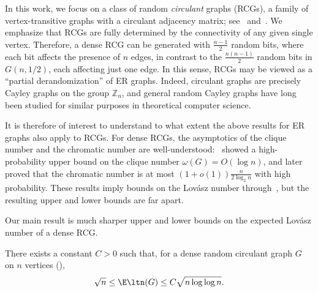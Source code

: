 In this work, we focus on a class of random \emph{circulant} graphs (RCGs), a family of vertex-transitive graphs with a circulant adjacency matrix; see~ and~. 
We emphasize that RCGs are fully determined by the connectivity of any given single vertex. Therefore, a dense RCG can be generated with \(\frac{n - 1}{2}\) random bits, where each bit affects the presence of \(n\) edges, in contrast to the \(\frac{n(n - 1)}{2}\) random bits in $G(n,1/2)$, each affecting just one edge.
In this sense, RCGs may be viewed as a ``partial derandomization'' of ER graphs.
Indeed, circulant graphs are precisely Cayley graphs on the group \(\mathbb{Z}_n\), and general random Cayley graphs have long been studied for similar purposes in theoretical computer science.


It is therefore of interest to understand to what extent the above results for ER graphs also apply to RCGs.
For dense RCGs, the asymptotics of the clique number and the chromatic number are well-understood:~\cite{green2005counting} showed a high-probability upper bound on the clique number \(\omega(G) = O(\log n)\), and later~\cite{green2016counting} proved that the chromatic number is at most $(1+o(1)) \frac{n} { 2 \log_2 n}$ with high probability. 
These results imply bounds on the Lovász number through~, but the resulting upper and lower bounds are far apart.

Our main result is much sharper upper and lower bounds on the expected Lovász number of a dense RCG. 
\begin{theorem}
\label{thm:main}
    There exists a constant $C > 0$ such that, for a dense random circulant graph \(G\) on $n$ vertices (),
    \begin{equation}
        \sqrt{n} \leq \E \ltn(G) \leq C \sqrt{n \log \log n}.
    \end{equation}
\end{theorem}

